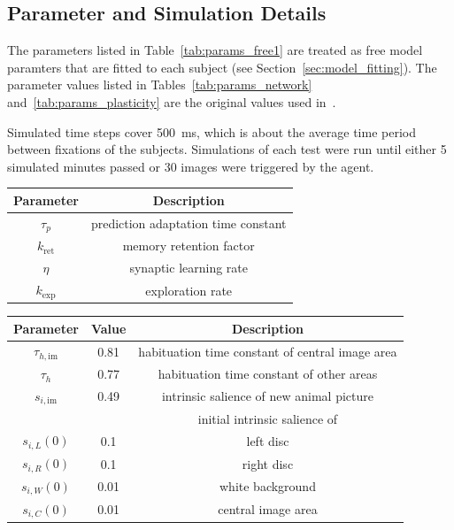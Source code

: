 \documentclass[a4paper]{scrreprt}
\begin{document}
\subsection{Parameter and Simulation Details}
\label{ssec:params}

The parameters listed in Table~\ref{tab:params_free1} are treated as free model paramters that are fitted to each subject (see Section~\ref{sec:model_fitting}). The parameter values listed in Tables~\ref{tab:params_network} and~\ref{tab:params_plasticity} are the original values used in~\cite{bg13}.

Simulated time steps cover 500~ms, which is about the average time period between fixations of the subjects. Simulations of each test were run until either 5 simulated minutes passed or 30 images were triggered by the agent.

\begin{center}
\begin{tabular}{ c  c }
\hline
Parameter & Description\\
\hline
$\tau_p$ & prediction adaptation time constant\\
$k_{\text{ret}}$ & memory retention factor\\
$\eta$ & synaptic learning rate\\
$k_{\text{exp}}$ & exploration rate\\
\hline
\end{tabular}
\label{tab:params_free1}
\end{center}


\begin{center}
\begin{tabular}{ c  c  c }
\hline
Parameter & Value & Description\\
\hline
$\tau_{h,\text{im}}$ & 0.81 & habituation time constant of central image area\\
$\tau_{h}$ & 0.77 & habituation time constant of other areas\\
$s_{i, \text{im}}$ & 0.49 & intrinsic salience of new animal picture\\
\hline
&& initial intrinsic salience of\\
$s_{i, L}(0)$ & 0.1 & left disc\\
$s_{i, R}(0)$ & 0.1 & right disc\\
$s_{i, W}(0)$ & 0.01 & white background\\
$s_{i, C}(0)$ & 0.01 & central image area\\
\hline
\end{tabular}
\label{tab:params_int_sal1}
\end{center}
\end{document}
